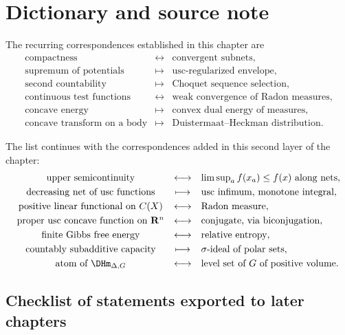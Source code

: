 \section{Dictionary and source note}

The recurring correspondences established in this chapter are
\[
\begin{array}{ccl}
\text{compactness} &\longleftrightarrow&
   \text{convergent subnets},\\
\text{supremum of potentials} &\longmapsto&
   \text{usc-regularized envelope},\\
\text{second countability} &\longmapsto&
   \text{Choquet sequence selection},\\
\text{continuous test functions} &\longleftrightarrow&
   \text{weak convergence of Radon measures},\\
\text{concave energy} &\longmapsto&
   \text{convex dual energy of measures},\\
\text{concave transform on a body} &\longmapsto&
   \text{Duistermaat--Heckman distribution}.
\end{array}
\]

The list continues with the correspondences added in this second layer of the
chapter:
\[
\begin{array}{ccl}
\text{upper semicontinuity} &\longleftrightarrow&
   \limsup_a f(x_a)\leq f(x)\ \text{along nets},\\[1mm]
\text{decreasing net of usc functions} &\longmapsto&
   \text{usc infimum, monotone integral},\\[1mm]
\text{positive linear functional on }C(X) &\longleftrightarrow&
   \text{Radon measure},\\[1mm]
\text{proper usc concave function on }\mathbf R^n &\longleftrightarrow&
   \text{conjugate, via biconjugation},\\[1mm]
\text{finite Gibbs free energy} &\longleftrightarrow&
   \text{relative entropy},\\[1mm]
\text{countably subadditive capacity} &\longmapsto&
   \sigma\text{-ideal of polar sets},\\[1mm]
\text{atom of }\DHm_{\Delta,G} &\longleftrightarrow&
   \text{level set of }G\text{ of positive volume}.
\end{array}
\]

\subsection*{Checklist of statements exported to later chapters}

